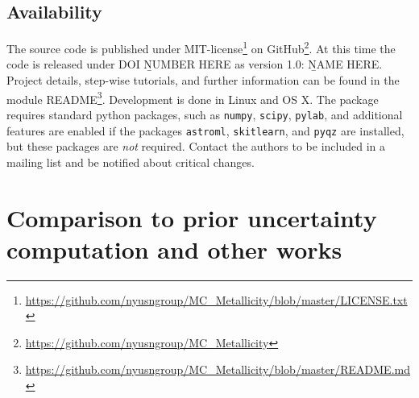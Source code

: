 \documentclass{emulateapj}
\begin{document}
\subsection{Availability}
The source code is published under MIT-license\footnote{\url{https://github.com/nyusngroup/MC_Metallicity/blob/master/LICENSE.txt}} on GitHub\footnote{\url{https://github.com/nyusngroup/MC_Metallicity}}. At this time the code is released under DOI {\b NUMBER HERE} as version 1.0: {\b NAME HERE}. Project
details, step-wise tutorials, and further information can be found in the module README\footnote{\url{https://github.com/nyusngroup/MC_Metallicity/blob/master/README.md}}.
Development is done in Linux and OS X. The package requires standard python packages, such as \verb=numpy=, \verb=scipy=, \verb=pylab=, and additional features are enabled if the packages \verb=astroml=, \verb=skitlearn=, and \verb=pyqz= are installed, but these packages are \emph{not} required. Contact the authors to be included in a mailing list and be notified about critical changes. 




\section{Comparison to prior uncertainty computation and other works }\label{comp_sec}
\end{document}
